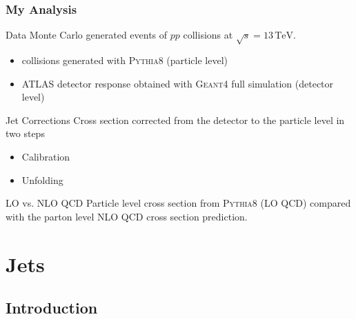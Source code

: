 \documentclass[compress]{beamer}
\newcommand{\TeV}{\,\text{TeV}}
\begin{document}
\begin{frame}
\frametitle{My Analysis} 

\begin{block}{Data}
  Monte Carlo generated events of $pp$ collisions at $\sqrt{s}=13\TeV$. 
  \begin{itemize}
    \item collisions generated with \textsc{Pythia8} (particle level)
    \item ATLAS detector response obtained with \textsc{Geant4} full
      simulation (detector level)
  \end{itemize}
\end{block}

\begin{block}{Jet Corrections}
  Cross section corrected from the detector to the particle level in two steps
  \begin{itemize}
    \item Calibration
    \item Unfolding
  \end{itemize}
\end{block}

\begin{block}{LO vs. NLO QCD}
  Particle level cross section from \textsc{Pythia8} (LO QCD) compared with the
  parton level NLO QCD cross section prediction.  
\end{block}

\end{frame}

\section{Jets}
\subsection{Introduction}
\end{document}
